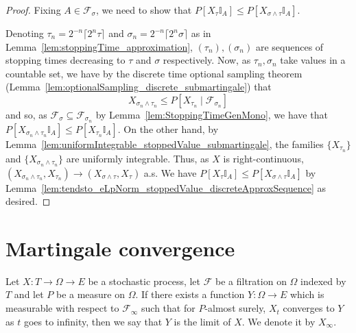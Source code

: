 \begin{proof}
  Fixing $A \in \mathcal{F}_{\sigma}$, we need to show that $P[X_{\tau} \mathbb{I}_A] \le P[X_{\sigma \wedge \tau} \mathbb{I}_A]$.

  Denoting $\tau_n = 2^{-n} \lceil 2^n \tau \rceil$ and $\sigma_n = 2^{-n} \lceil 2^n \sigma \rceil$ as in
  Lemma~\ref{lem:stoppingTime_approximation}, $(\tau_n), (\sigma_n)$ are sequences of stopping times
  decreasing to $\tau$ and $\sigma$ respectively. Now, as $\tau_n, \sigma_n$ take values in a countable set,
  we have by the discrete time optional sampling theorem (Lemma~\ref{lem:optionalSampling_discrete_submartingale}) that
  $$X_{\sigma_n \wedge \tau_n} \le P[X_{\tau_n} \mid \mathcal{F}_{\sigma_n}]$$
  and so, as \(\mathcal{F}_{\sigma} \subseteq \mathcal{F}_{\sigma_n}\) by Lemma~\ref{lem:StoppingTimeGenMono},
  we have that $P[X_{\sigma_n \wedge \tau_n} \mathbb{I}_A] \le P[X_{\tau_n} \mathbb{I}_A]$.
  On the other hand, by Lemma~\ref{lem:uniformIntegrable_stoppedValue_submartingale}, the families $\{X_{\tau_n}\}$ and $\{X_{\sigma_n \wedge \tau_n}\}$ are uniformly integrable.
  Thus, as $X$ is right-continuous, $(X_{\sigma_n \wedge \tau_n}, X_{\tau_n}) \to (X_{\sigma \wedge \tau}, X_{\tau})$ a.s.
  We have $P[X_{\tau} \mathbb{I}_A] \le P[X_{\sigma \wedge \tau} \mathbb{I}_A]$
  by Lemma~\ref{lem:tendsto_eLpNorm_stoppedValue_discreteApproxSequence} as desired.
\end{proof}

\section{Martingale convergence}

\begin{definition}\label{def:limitProcess}
  \mathlibok
Let $X : T \to \Omega \to E$ be a stochastic process, let $\mathcal{F}$ be a filtration on $\Omega$ indexed by $T$ and let $P$ be a measure on $\Omega$.
If there exists a function $Y : \Omega \to E$ which is measurable with respect to $\mathcal{F}_\infty$ such that for $P$-almost surely, $X_t$ converges to $Y$ as $t$ goes to infinity, then we say that $Y$ is the limit of $X$.
We denote it by $X_\infty$.
\end{definition}


